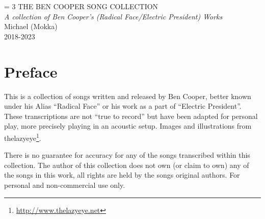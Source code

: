 \documentclass[sans, english]{songbook}
\begin{document}
 \frontmatter
 {\begingroup%
  \drop = 3\baselineskip
  \centering
  \vspace*{4cm}\null
  \vspace*{\drop}
  {\fontsize{45}{55}\selectfont THE BEN COOPER SONG COLLECTION}\\[2cm]
  {\Large\itshape A collection of Ben Cooper's (Radical Face/Electric President) Works}\\[1cm]
  \vfill
  {\Large Michael (Mokka)}\\
  \vspace*{\drop}
  {\scshape 2018-2023}\par
  \vspace*{\drop}
 \endgroup}

 
 \maketoc
 \newpage
 \vspace*{1cm}
 
 \chapter*{Preface}
 
 \begin{spacing}{1.5}
 \fontsize{14}{16}\selectfont
  This is a collection of songs written and released by Ben Cooper, better known under his Alias ``Radical Face'' or his work as a part of ``Electric President''. These transcriptions are not ``true to record'' but have been adapted for personal play, more precisely playing in an acoustic setup. Images and illustrations from thelazyeye\footnote{\url{http://www.thelazyeye.net}}.\par There is no guarantee for accuracy for any of the songs transcribed within this collection. The author of this collection does not own (or claim to own) any of the songs in this work, all rights are held by the songs original authors. For personal and non-commercial use only.
 \end{spacing}
 
 \mainmatter
 
 
 \newpage
 
 
 
 
 
\end{document}
